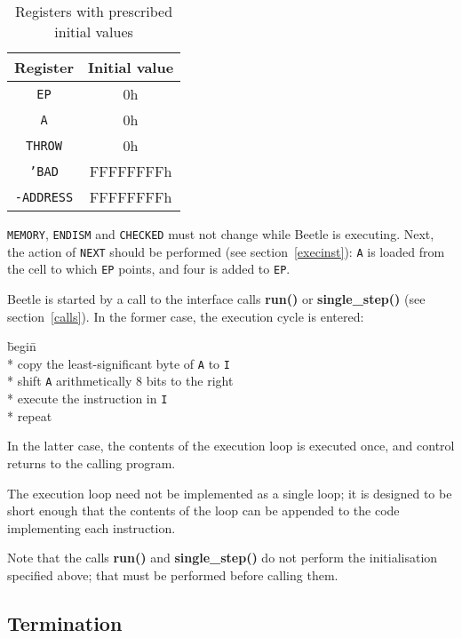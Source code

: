 \documentclass{article}
\begin{document}
\begin{table}[htbp]
\begin{center}
\begin{tabular}{cc} \toprule
\bf Register & \bf Initial value \\ \midrule
{\tt EP} & 0h \\
{\tt A} & 0h \\
{\tt THROW} & 0h \\
{\tt 'BAD} & {FFFFFFFFh} \\
{\tt -ADDRESS} & {FFFFFFFFh} \\ \bottomrule
\end{tabular}
\caption{\label{inittable}Registers with prescribed initial values}
\end{center}
\end{table}

{\tt MEMORY}, {\tt ENDISM} and {\tt CHECKED} must not change while Beetle is executing. Next, the action of
{\tt NEXT} should be performed (see section~\ref{execinst}): {\tt A} is loaded
from the cell to which {\tt EP} points, and four is added to {\tt EP}.

Beetle is started by a call to the interface calls {\bf run()} or {\bf
single\_step()} (see section~\ref{calls}). In the former case, the execution
cycle is entered:

\begin{tabbing}
\hspace{0.5in}\=begin\=\+\+ \\*
copy the least-significant byte of {\tt A} to {\tt I} \\*
shift {\tt A} arithmetically 8 bits to the right \\*
execute the instruction in {\tt I} \- \\*
repeat
\end{tabbing}

In the latter case, the contents of the execution loop is executed once, and
control returns to the calling program.

The execution loop need not be implemented as a single loop; it  is designed to
be short enough that the contents of the loop can be appended  to the code
implementing each instruction.

Note that the calls {\bf run()} and {\bf single\_step()} do not perform the
initialisation specified above; that must be performed before calling them.


\subsection{Termination}
\end{document}
